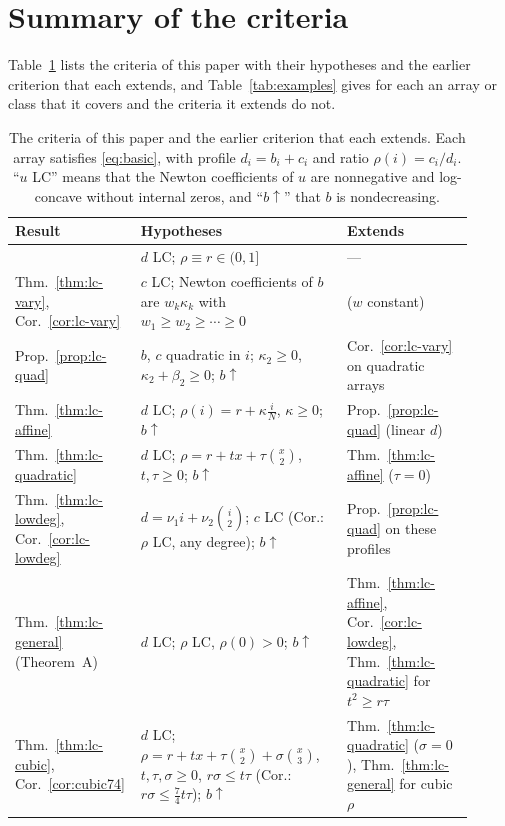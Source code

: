 \section{Summary of the criteria}\label{sec:summary}
Table~\ref{tab:map} lists the criteria of this paper with their hypotheses and the earlier criterion that each extends, and Table~\ref{tab:examples} gives for each an array or class that it covers and the criteria it extends do not.

\begin{table}[!ht]
\centering
\caption{The criteria of this paper and the earlier criterion that each extends. Each array satisfies \eqref{eq:basic}, with profile $d_i=b_i+c_i$ and ratio $\rho(i)=c_i/d_i$. ``$u$ LC'' means that the Newton coefficients of $u$ are nonnegative and log-concave without internal zeros, and ``$b\!\uparrow$'' that $b$ is nondecreasing.}\label{tab:map}
\renewcommand{\arraystretch}{1.15}
\begin{tabular}{@{}>{\raggedright\arraybackslash}p{0.2\linewidth}>{\raggedright\arraybackslash}p{0.44\linewidth}>{\raggedright\arraybackslash}p{0.27\linewidth}@{}}
Result & Hypotheses & Extends\\\hline
\cite{P1} & $d$ LC; $\rho\equiv r\in(0,1]$ & ---\\
Thm.~\ref{thm:lc-vary}, Cor.~\ref{cor:lc-vary} & $c$ LC; Newton coefficients of $b$ are $w_k\kappa_k$ with $w_1\geq w_2\geq\cdots\geq0$ & \cite{P1} ($w$ constant)\\
Prop.~\ref{prop:lc-quad} & $b$, $c$ quadratic in $i$; $\kappa_2\geq0$, $\kappa_2+\beta_2\geq0$; $b\!\uparrow$ & Cor.~\ref{cor:lc-vary} on quadratic arrays\\
Thm.~\ref{thm:lc-affine} & $d$ LC; $\rho(i)=r+\kappa\frac iN$, $\kappa\geq0$; $b\!\uparrow$ & Prop.~\ref{prop:lc-quad} (linear $d$)\\
Thm.~\ref{thm:lc-quadratic} & $d$ LC; $\rho=r+tx+\tau\binom x2$, $t,\tau\geq0$; $b\!\uparrow$ & Thm.~\ref{thm:lc-affine} ($\tau=0$)\\
Thm.~\ref{thm:lc-lowdeg}, Cor.~\ref{cor:lc-lowdeg} & $d=\nu_1i+\nu_2\binom i2$; $c$ LC (Cor.: $\rho$ LC, any degree); $b\!\uparrow$ & Prop.~\ref{prop:lc-quad} on these profiles\\
Thm.~\ref{thm:lc-general} (Theorem~A) & $d$ LC; $\rho$ LC, $\rho(0)>0$; $b\!\uparrow$ & Thm.~\ref{thm:lc-affine}, Cor.~\ref{cor:lc-lowdeg}, Thm.~\ref{thm:lc-quadratic} for $t^2\geq r\tau$\\
Thm.~\ref{thm:lc-cubic}, Cor.~\ref{cor:cubic74} & $d$ LC; $\rho=r+tx+\tau\binom x2+\sigma\binom x3$, $t,\tau,\sigma\geq0$, $r\sigma\leq t\tau$ (Cor.: $r\sigma\leq\frac74t\tau$); $b\!\uparrow$ & Thm.~\ref{thm:lc-quadratic} ($\sigma=0$), Thm.~\ref{thm:lc-general} for cubic $\rho$
\end{tabular}
\end{table}

